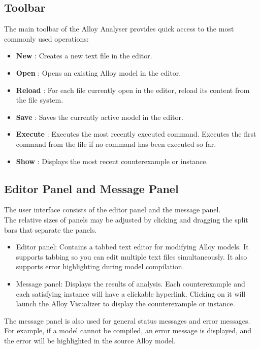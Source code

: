 \documentclass[a4paper,12pt]{extarticle}
\begin{document}
\subsection{Toolbar}
\label{Tools}
The main toolbar of the Alloy Analyser provides quick access to the most commonly used operations:
\begin{itemize}
\item \textbf{New} : Creates a new text file in the editor.
\item \textbf{Open} : Opens an existing Alloy model in the editor.
\item \textbf{Reload} : For each file currently open in the editor, reload its content from the file system.
\item \textbf{Save} : Saves the currently active model in the editor.
\item \textbf{Execute} : Executes the most recently executed command. Executes the first command from the file if no command has been executed so far.
\item \textbf{Show} : Displays the most recent counterexample or instance.
\end{itemize}
\subsection{Editor Panel and Message Panel}
\label{Editor and Message Panel}
The user interface consists of the editor panel and the message panel.\\
The relative sizes of panels may be adjusted by clicking and dragging the split bars that separate the panels.
\begin{itemize}
\item 	Editor panel: Contains a tabbed text editor for modifying Alloy models. It supports tabbing so you can edit multiple text files simultaneously. It also supports error highlighting during model compilation.
\item 	Message panel: Displays the results of analysis. Each counterexample and each satisfying instance will have a clickable hyperlink. Clicking on it will launch the Alloy Visualizer to display the counterexample or instance.
\end{itemize}
The message panel is also used for general status messages and error messages.\\
For example, if a model cannot be compiled, an error message is displayed, and the error will be highlighted in the source Alloy model.
\end{document}
